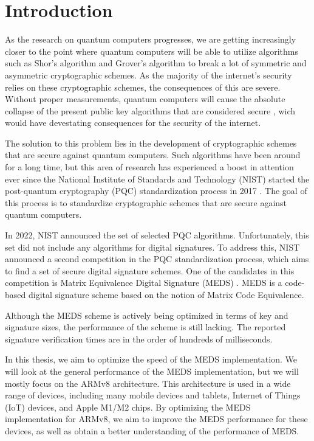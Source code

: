\documentclass[11pt,a4paper]{report}
\begin{document}
\chapter{Introduction}
\label{ch:introduction}
As the research on quantum computers progresses, we are getting increasingly closer to the point where quantum computers will be able to utilize algorithms such as Shor's algorithm and Grover's algorithm to break a lot of symmetric and asymmetric cryptographic schemes. As the majority of the internet's security relies on these cryptographic schemes, the consequences of this are severe. Without proper measurements, quantum computers will cause the absolute collapse of the present public key algorithms that are considered secure \cite{mavroeidis2018impact}, wich would have devestating consequences for the security of the internet.

The solution to this problem lies in the development of cryptographic schemes that are secure against quantum computers. Such algorithms have been around for a long time, but this area of research has experienced a boost in attention ever since the National Institute of Standards and Technology (NIST) started the post-quantum cryptography (PQC) standardization process in 2017 \cite{nist2017pqc}. The goal of this process is to standardize cryptographic schemes that are secure against quantum computers.

In 2022, NIST announced the set of selected PQC algorithms. Unfortunately, this set did not include any algorithms for digital signatures. To address this, NIST announced a second competition in the PQC standardization process, which aims to find a set of secure digital signature schemes. One of the candidates in this competition is Matrix Equivalence Digital Signature (MEDS) \cite{chou2023take}. MEDS is a code-based digital signature scheme based on the notion of Matrix Code Equivalence.

Although the MEDS scheme is actively being optimized in terms of key and signature sizes, the performance of the scheme is still lacking. The reported signature verification times are in the order of hundreds of milliseconds. 

In this thesis, we aim to optimize the speed of the MEDS implementation. We will look at the general performance of the MEDS implementation, but we will mostly focus on the ARMv8 architecture. This architecture is used in a wide range of devices, including many mobile devices and tablets, Internet of Things (IoT) devices, and Apple M1/M2 chips. By optimizing the MEDS implementation for ARMv8, we aim to improve the MEDS performance for these devices, as well as obtain a better understanding of the performance of MEDS.
\end{document}
